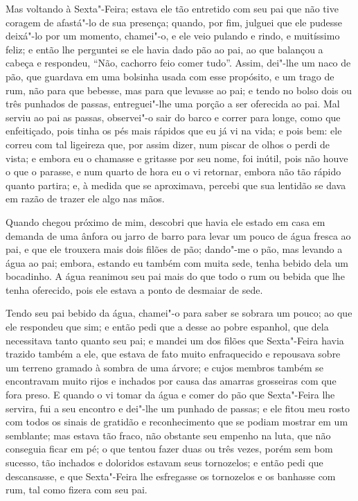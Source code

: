 Mas voltando à Sexta"-Feira; estava ele tão entretido com seu pai que não
tive coragem de afastá"-lo de sua presença; quando, por fim, julguei que
ele pudesse deixá"-lo por um momento, chamei"-o, e ele veio pulando e
rindo, e muitíssimo feliz; e então lhe perguntei se ele havia dado pão
ao pai, ao que balançou a cabeça e respondeu, ``Não, cachorro feio comer
tudo''. Assim, dei"-lhe um naco de pão, que guardava em uma bolsinha
usada com esse propósito, e um trago de rum, não para que bebesse, mas
para que levasse ao pai; e tendo no bolso dois ou três punhados de
passas, entreguei"-lhe uma porção a ser oferecida ao pai. Mal serviu ao
pai as passas, observei"-o sair do barco e correr para longe, como que
enfeitiçado, pois tinha os pés mais rápidos que eu já vi na vida; e pois
bem: ele correu com tal ligeireza que, por assim dizer, num piscar de
olhos o perdi de vista; e embora eu o chamasse e gritasse por seu nome,
foi inútil, pois não houve o que o parasse, e num quarto de hora eu o vi
retornar, embora não tão rápido quanto partira; e, à medida que se
aproximava, percebi que sua lentidão se dava em razão de trazer ele algo
nas mãos.

Quando chegou próximo de mim, descobri que havia ele estado em casa em
demanda de uma ânfora ou jarro de barro para levar um pouco de água
fresca ao pai, e que ele trouxera mais dois filões de pão; dando"-me o
pão, mas levando a água ao pai; embora, estando eu também com muita
sede, tenha bebido dela um bocadinho. A água reanimou seu pai mais do
que todo o rum ou bebida que lhe tenha oferecido, pois ele estava a
ponto de desmaiar de sede.

Tendo seu pai bebido da água, chamei"-o para saber se sobrara um pouco;
ao que ele respondeu que sim; e então pedi que a desse ao pobre
espanhol, que dela necessitava tanto quanto seu pai; e mandei um dos
filões que Sexta"-Feira havia trazido também a ele, que estava de fato
muito enfraquecido e repousava sobre um terreno gramado à sombra de uma
árvore; e cujos membros também se encontravam muito rijos e inchados por
causa das amarras grosseiras com que fora preso. E quando o vi tomar da
água e comer do pão que Sexta"-Feira lhe servira, fui a seu encontro e
dei"-lhe um punhado de passas; e ele fitou meu rosto com todos os sinais
de gratidão e reconhecimento que se podiam mostrar em um semblante; mas
estava tão fraco, não obstante seu empenho na luta, que não conseguia
ficar em pé; o que tentou fazer duas ou três vezes, porém sem bom
sucesso, tão inchados e doloridos estavam seus tornozelos; e então pedi
que descansasse, e que Sexta"-Feira lhe esfregasse os tornozelos e os
banhasse com rum, tal como fizera com seu pai.

